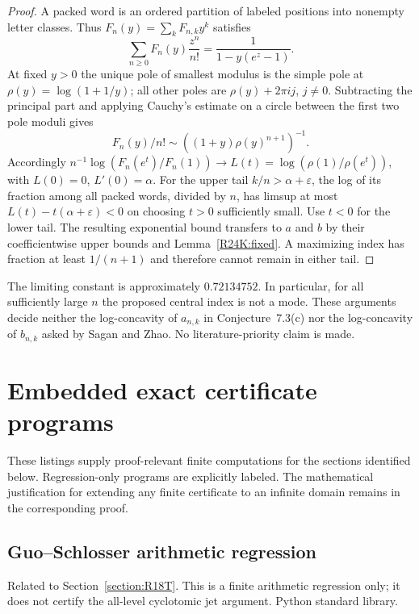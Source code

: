 \documentclass[11pt,a4paper]{article}
\begin{document}
\begin{proof}
A packed word is an ordered partition of labeled positions into nonempty letter classes. Thus $F_n(y)=\sum_k F_{n,k}y^k$ satisfies
\[
 \sum_{n\ge0} F_n(y)\frac{z^n}{n!}=\frac1{1-y(e^z-1)} .
\]
At fixed $y>0$ the unique pole of smallest modulus is the simple pole at $\rho(y)=\log(1+1/y)$; all other poles are $\rho(y)+2\pi i j$, $j\ne0$. Subtracting the principal part and applying Cauchy's estimate on a circle between the first two pole moduli gives
\[
 F_n(y)/n!\sim ((1+y)\rho(y)^{n+1})^{-1}.
\]
Accordingly $n^{-1}\log(F_n(e^t)/F_n(1))\to
L(t)=\log(\rho(1)/\rho(e^t))$, with $L(0)=0$, $L'(0)=\alpha$.
For the upper tail $k/n>\alpha+\varepsilon$, the log of its fraction among all packed words, divided by $n$, has limsup at most $L(t)-t(\alpha+\varepsilon)<0$ on choosing $t>0$ sufficiently small. Use $t<0$ for the lower tail. The resulting exponential bound transfers to $a$ and $b$ by their coefficientwise upper bounds and Lemma~\ref{R24K:fixed}. A maximizing index has fraction at least $1/(n+1)$ and therefore cannot remain in either tail.
\end{proof}

The limiting constant is approximately $0.72134752$. In particular, for all sufficiently large $n$ the proposed central index is not a mode. These arguments decide neither the log-concavity of $a_{n,k}$ in Conjecture~7.3(c) nor the log-concavity of $b_{n,k}$ asked by Sagan and Zhao. No literature-priority claim is made.
\endgroup

\clearpage\appendix
\section{Embedded exact certificate programs}
These listings supply proof-relevant finite computations for the sections identified below. Regression-only programs are explicitly labeled. The mathematical justification for extending any finite certificate to an infinite domain remains in the corresponding proof.
\subsection{Guo--Schlosser arithmetic regression}
\noindent Related to Section~\ref{section:R18T}. This is a finite arithmetic regression only; it does not certify the all-level cyclotomic jet argument. Python standard library.
\end{document}
